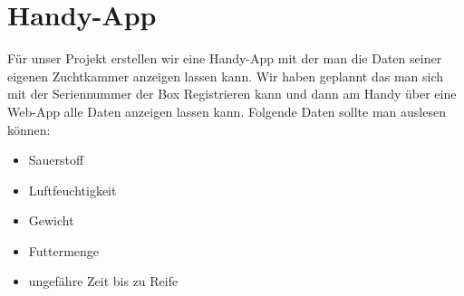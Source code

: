 \def \currentAuthor {Florian Tipotsch}

\section{Handy-App}

Für unser Projekt erstellen wir eine Handy-App mit der man die Daten seiner eigenen Zuchtkammer anzeigen lassen kann.
Wir haben geplannt das man sich mit der Seriennummer der Box Registrieren kann und dann am Handy über eine Web-App alle Daten anzeigen lassen kann. Folgende Daten sollte man auslesen können:

\begin{itemize}
	\item Sauerstoff
	\item Luftfeuchtigkeit
	\item Gewicht
	\item Futtermenge
	\item ungefähre Zeit bis zu Reife
\end{itemize}

